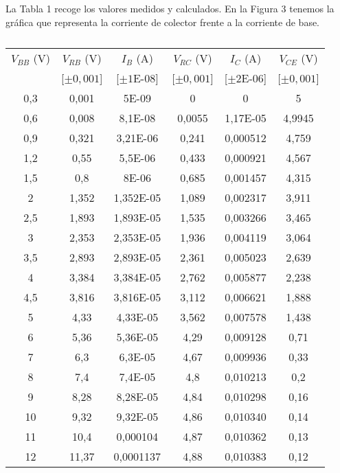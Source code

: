 \documentclass[a4paper,12pt,spanish]{article}
\begin{document}
La Tabla 1 recoge los valores medidos y calculados. En la Figura 3 tenemos la gráfica que representa la corriente de colector frente a la corriente de base.



\begin{table}[H]
	\centering
	\begin{tabular}{|c|c|c|c|c|c|}
		\hline
		$V_{BB}$ (V) & $V_{RB}$ (V)   & $I_B$ (A)     & $V_{RC}$ (V)  & $I_C$ (A)    & $V_{CE}$ (V)  \\ 
		&[$\pm0,001$] &[$\pm1$E-08] &[$\pm0,001$] &[$\pm2$E-06]  &[$\pm0,001$]\\\hline
		0,3   & 0,001 & 5E-09     & 0      &   0     & 5      \\ \hline
		0,6   & 0,008 & 8,1E-08   & 0,0055 &  1,17E-05 & 4,9945 \\ \hline
		0,9   & 0,321  & 3,21E-06  & 0,241  & 0,000512  & 4,759  \\ \hline
		1,2   & 0,55   & 5,5E-06   & 0,433  & 0,000921  & 4,567  \\ \hline
		1,5   & 0,8    & 8E-06     & 0,685  & 0,001457  & 4,315  \\ \hline
		2     & 1,352  & 1,352E-05 & 1,089  & 0,002317  & 3,911  \\ \hline
		2,5   & 1,893  & 1,893E-05 & 1,535  & 0,003266  & 3,465  \\ \hline
		3     & 2,353  & 2,353E-05 & 1,936  & 0,004119  & 3,064  \\ \hline
		3,5   & 2,893  & 2,893E-05 & 2,361  & 0,005023  & 2,639  \\ \hline
		4     & 3,384  & 3,384E-05 & 2,762  & 0,005877  & 2,238  \\ \hline
		4,5   & 3,816  & 3,816E-05 & 3,112  & 0,006621  & 1,888  \\ \hline
		5     & 4,33   & 4,33E-05  & 3,562  & 0,007578  & 1,438  \\ \hline
		6     & 5,36   & 5,36E-05  & 4,29   & 0,009128  & 0,71   \\ \hline
		7     & 6,3    & 6,3E-05   & 4,67   & 0,009936  & 0,33   \\ \hline
		8     & 7,4    & 7,4E-05   & 4,8    & 0,010213  & 0,2    \\ \hline
		9     & 8,28   & 8,28E-05  & 4,84   & 0,010298  & 0,16   \\ \hline
		10    & 9,32   & 9,32E-05  & 4,86   & 0,010340  & 0,14   \\ \hline
		11    & 10,4   & 0,000104  & 4,87   & 0,010362  & 0,13   \\ \hline
		12    & 11,37  & 0,0001137 & 4,88   & 0,010383  & 0,12   \\ \hline
	\end{tabular}
	\caption{}
	\label{tab:my-table}
\end{table}
\end{document}
